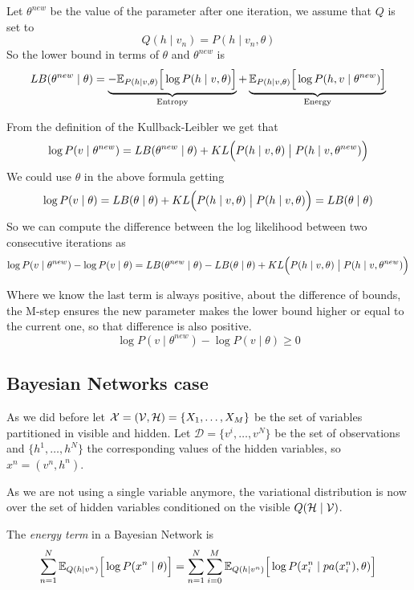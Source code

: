 Let \(\theta^{new}\) be the value of the parameter after one iteration, we assume that \(Q\) is set to
\[
  Q(h \mid v_{n}) = P(h \mid v_{n}, \theta)
\]
So the lower bound in terms of \(\theta\) and \(\theta^{new}\) is
\[
  LB(\theta^{new} \mid \theta) =  \underbrace{-\mathbb{E}_{P(h \mid v, \theta)}\Big[\log{P(h \mid v, \theta)}\Big]}_{\text{Entropy}} + \underbrace{\mathbb{E}_{P(h \mid v, \theta)}\Big[\log{P(h,v \mid \theta^{new})}\Big]}_{\text{Energy}}
\]

From the definition of the Kullback-Leibler we get that
\[
  \log{P(v \mid \theta^{new})} = LB(\theta^{new}\mid \theta) + KL\Big(P(h \mid v, \theta) \bigm| P(h \mid v, \theta^{new})\Big)
\]
We could use \(\theta\) in the above formula getting
\[
  \log{P(v \mid \theta)} = LB(\theta \mid \theta) + KL\Big(P(h \mid v, \theta) \bigm| P(h \mid v, \theta)\Big) = LB(\theta \mid \theta)
\]
So we can compute the difference between the log likelihood between two consecutive iterations as
\[
  \log{P(v \mid \theta^{new})} - \log{P(v \mid \theta)} = LB(\theta^{new}\mid \theta) - LB(\theta \mid \theta) +  KL\Big(P(h \mid v, \theta) \bigm| P(h \mid v, \theta^{new})\Big)
\]

Where we know the last term is always positive, about the difference of bounds, the M-step ensures the new parameter makes the lower bound higher or equal to the current one, so that difference is also positive.
\[
   \log{P(v \mid \theta^{new})} - \log{P(v \mid \theta)} \geq 0
\]

\subsection{Bayesian Networks case}

As we did before let \(\mathcal{X} = (\mathcal{V}, \mathcal{H}) = \{X_{1}, \dots , X_{M}\}\) be the set of variables partitioned in visible and hidden. Let \(\mathcal{D} = \{v^{i},\dots,v^{N}\}\) be the set of observations and \(\{h^{1},\dots, h^{N}\}\) the corresponding values of the hidden variables, so \(x^{n} = (v^{n}, h^{n})\).

As we are not using a single variable anymore, the variational distribution is now over the set of hidden variables conditioned on the visible \(Q(\mathcal{H} \mid \mathcal{V})\).

The \emph{energy term} in a Bayesian Network is
\[
  \sum_{n=1}^{N} \mathbb{E}_{Q(h \mid v^{n})}\Big[ \log{P(x^{n} \mid \theta)} \Big] = \sum_{n = 1}^{N}\sum_{i = 0}^{M} \mathbb{E}_{Q(h \mid v^{n})}\Big[\log{P(x_{i}^{n} \mid pa(x_{i}^{n}), \theta)}\Big]
\]

